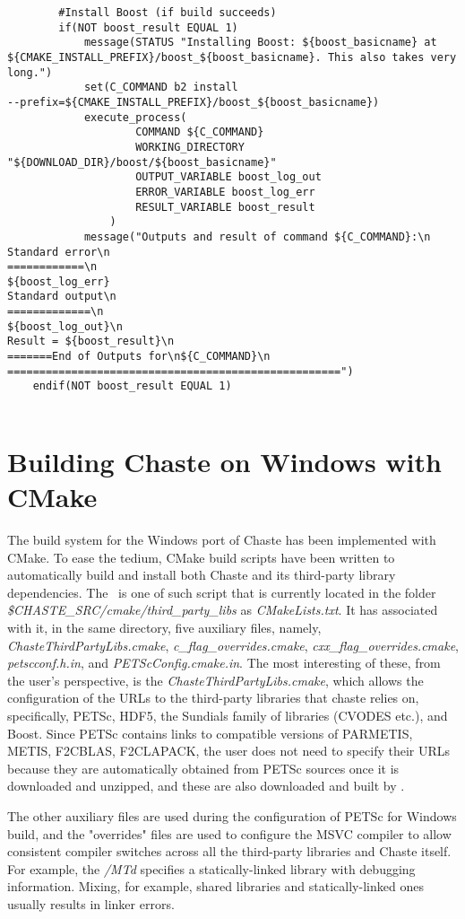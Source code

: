 \documentclass[10pt,a4paper]{article}
\begin{document}
\begin{codeparchment}
\begin{lstlisting}
		#Install Boost (if build succeeds)
		if(NOT boost_result EQUAL 1)	
			message(STATUS "Installing Boost: ${boost_basicname} at
${CMAKE_INSTALL_PREFIX}/boost_${boost_basicname}. This also takes very long.")
			set(C_COMMAND b2 install
--prefix=${CMAKE_INSTALL_PREFIX}/boost_${boost_basicname})
			execute_process(
					COMMAND ${C_COMMAND}
					WORKING_DIRECTORY "${DOWNLOAD_DIR}/boost/${boost_basicname}"
					OUTPUT_VARIABLE boost_log_out 
					ERROR_VARIABLE boost_log_err 
					RESULT_VARIABLE boost_result
				)
			message("Outputs and result of command ${C_COMMAND}:\n
Standard error\n
============\n
${boost_log_err}
Standard output\n
=============\n
${boost_log_out}\n
Result = ${boost_result}\n
=======End of Outputs for\n${C_COMMAND}\n
====================================================")
	endif(NOT boost_result EQUAL 1)
	 
\end{lstlisting}
\end{codeparchment}

\section{Building Chaste on Windows with CMake}
The build system for the Windows port of Chaste has been implemented with CMake.
To ease the tedium, CMake build scripts have been written to automatically build
and install both Chaste and its third-party library dependencies. The
\chastelibbuilder\ is one of such script that is currently located in the folder
\textit{\$CHASTE\_SRC/cmake/third\_party\_libs} as \textit{CMakeLists.txt}. It
has associated with it, in the same directory, five auxiliary files, namely,
\textit{ChasteThirdPartyLibs.cmake}, \textit{c\_flag\_overrides.cmake},
\textit{cxx\_flag\_overrides.cmake}, \textit{petscconf.h.in}, and
\textit{PETScConfig.cmake.in}. The most interesting of these, from the user's
perspective, is the \textit{ChasteThirdPartyLibs.cmake}, which allows the
configuration of the URLs to the third-party libraries that chaste relies on,
specifically, PETSc, HDF5, the Sundials family of libraries (CVODES etc.), and
Boost. Since PETSc contains links to compatible versions of PARMETIS, METIS,
F2CBLAS, F2CLAPACK, the user does not need to specify their URLs because they
are automatically obtained from PETSc sources once it is downloaded and
unzipped, and these are also downloaded and built by \chastelibbuilder.

The other auxiliary files are used during the configuration of PETSc for Windows
build, and the "overrides" files are used to configure the MSVC compiler to
allow consistent compiler switches across all the third-party libraries and
Chaste itself. For example, the \textit{/MTd} specifies a statically-linked
library with debugging information. Mixing, for example, shared libraries and
statically-linked ones usually results in linker errors.
\end{document}
